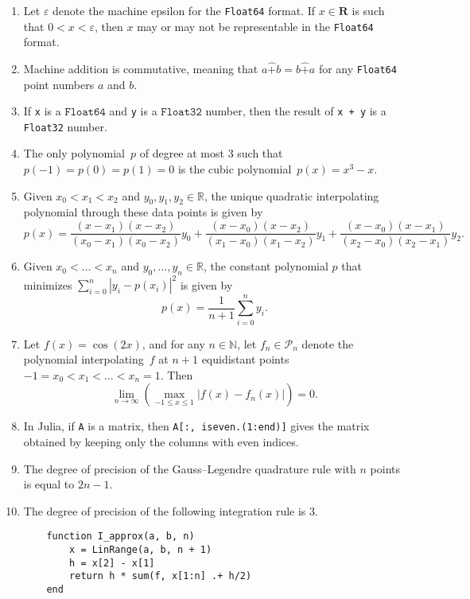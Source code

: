 \documentclass{article}
\newcommand{\julia}[1]{\texttt{#1}}
\begin{document}
\begin{enumerate}

    \item
        Let $\varepsilon$ denote the machine epsilon for the \julia{Float64} format.
        If $x \in \mathbf R$ is such that $0 < x < \varepsilon$,
        then $x$ may or may not be representable in the \julia{Float64} format.

    \item
        Machine addition is commutative,
        meaning that $a \widehat + b = b \widehat + a$
        for any \julia{Float64} point numbers $a$ and $b$.

    \item
        If \julia{x} is a $\julia{Float64}$ and \julia{y} is a $\julia{Float32}$ number,
        then the result of \julia{x + y} is a \julia{Float32} number.

    \item
        The only polynomial~$p$ of degree at most 3 such that $p(-1) = p(0) = p(1) = 0$ is the 
        cubic polynomial~$p(x) = x^3 - x$.

    \item
        Given $x_0 < x_1 < x_2$
        and $y_0, y_1, y_2 \in \mathbb R$,
        the unique quadratic interpolating polynomial through these data points is given by
        \[
            p(x) = 
            \frac{(x - x_1) (x-x_2)}{(x_0 - x_1) (x_0 - x_2)} y_0
            +
            \frac{(x - x_0) (x-x_2)}{(x_1 - x_0) (x_1 - x_2)} y_1
            +
            \frac{(x - x_0) (x-x_1)}{(x_2 - x_0) (x_2 - x_1)} y_2.
        \]

    \item
        Given $x_0 < \dotsc < x_n$
        and $y_0, \dotsc, y_n \in \mathbb R$,
        the constant polynomial $p$ that minimizes $\sum_{i=0}^{n} |y_i - p(x_i)|^2$
        is given by
        \[
            p(x) = \frac{1}{n+1} \sum_{i=0}^{n} y_i.
        \]
    \item
        Let $f(x) = \cos(2x)$, 
        and for any $n \in \mathbb N$,
        let $f_n \in \mathcal P_n$ denote the polynomial interpolating~$f$ at $n+1$ equidistant points $-1 = x_0 < x_1 < \dotsc < x_n = 1$.
        Then
        \[
            \lim_{n \to \infty} \left( \max_{-1 \leq x \leq 1} \bigl\lvert f(x) - f_n(x) \bigr\rvert \right) = 0.
        \]

    \item
        In Julia, if \julia{A} is a matrix,
        then \julia{A[:, iseven.(1:end)]} gives the matrix obtained by keeping only the columns with even indices. 

    \item
        The degree of precision of the Gauss--Legendre quadrature rule with $n$ points is equal to $2n - 1$.

    \item
        The degree of precision of the following integration rule is 3. 
        \begin{verbatim}
    function I_approx(a, b, n)
        x = LinRange(a, b, n + 1)
        h = x[2] - x[1]
        return h * sum(f, x[1:n] .+ h/2)
    end
        \end{verbatim}

\end{enumerate}
\end{document}
